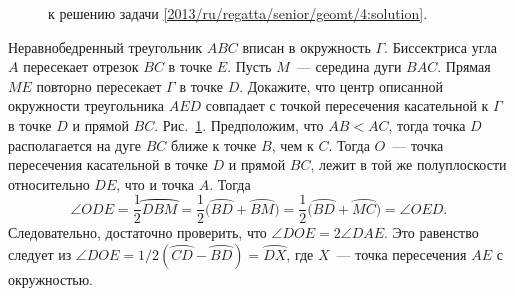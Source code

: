 \ifsolution
\begin{figure}\centering
    \caption{к решению задачи \ref{2013/ru/regatta/senior/geomt/4:solution}.}
    \label{2013/ru/regatta/senior/geomt/4:solution:fig}
\end{figure}%
\fi %

\problem
Неравнобедренный треугольник $ABC$ вписан в окружность $\Gamma$.
Биссектриса угла $A$ пересекает отрезок $BC$ в точке $E$.
Пусть $M$~--- середина дуги $BAC$.
Прямая $ME$ повторно пересекает $\Gamma$ в точке $D$.
Докажите, что центр описанной окружности треугольника $AED$ совпадает с точкой
пересечения касательной к $\Gamma$ в точке $D$ и прямой $BC$.
\solution
\label{2013/ru/regatta/senior/geomt/4:solution}%
\ifx\wideparen\undefined\else\let\widearc\wideparen\fi
\ifx\overparen\undefined\else\let\widearc\overparen\fi
Рис.~\ref{2013/ru/regatta/senior/geomt/4:solution:fig}.
Предположим, что $AB < AC$, тогда точка $D$ располагается на дуге $BC$ ближе к
точке $B$, чем к $C$.
Тогда $O$~--- точка пересечения касательной в точке $D$ и прямой $BC$, лежит в
той же полуплоскости относительно $DE$, что и точка $A$.
Тогда
\[
    \angle ODE
=
    \frac{1}{2} \widearc{DBM}
=
    \frac{1}{2} \bigl( \widearc{BD} + \widearc{BM} \bigr)
=
    \frac{1}{2} \bigl( \widearc{BD} + \widearc{MC} \bigr)
=
    \angle OED
. \, \]
Следовательно, достаточно проверить, что $\angle DOE = 2\angle DAE$.
Это равенство следует из
$\angle DOE = 1 / 2 (\widearc{CD}-\widearc{BD}) = \widearc{DX}$,
где $X$~--- точка пересечения $AE$ с окружностью.
\endproblem
